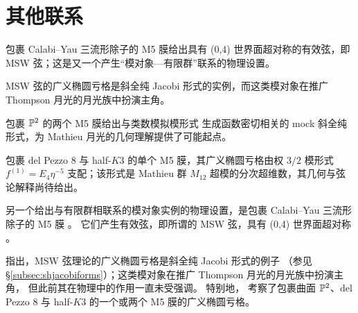 \section{其他联系}
\label{sec:other_physics}

\begin{keytakeaways}
  \item 包裹 Calabi–Yau 三流形除子的 M5 膜给出具有 (0,4) 世界面超对称的有效弦，即 MSW 弦；这是又一个产生“模对象—有限群”联系的物理设置。
  \item MSW 弦的广义椭圆亏格是斜全纯 Jacobi 形式的实例，而这类模对象在推广 Thompson 月光的月光族中扮演主角。
  \item 包裹 $\mathbb{P}^2$ 的两个 M5 膜给出与类数模拟模形式  生成函数密切相关的 mock 斜全纯形式，为 Mathieu 月光的几何理解提供了可能起点。
  \item 包裹 del Pezzo 8 与 half-$K3$ 的单个 M5 膜，其广义椭圆亏格由权 $3/2$ 模形式 $f^{(1)}= E_4\eta^{-5}$ 支配；该形式是 Mathieu 群 $M_{12}$ 超模的分次超维数，其几何与弦论解释尚待给出。
\end{keytakeaways}


另一个给出与有限群相联系的模对象实例的物理设置，是包裹 Calabi–Yau 三流形除子的 M5 膜 \cite{Cheng:2017dlj}。
它们产生有效弦，即所谓的 MSW 弦，具有 (0,4) 世界面超对称 \cite{Maldacena:1997de}。


\cite{Cheng:2017dlj} 指出，MSW 弦理论的广义椭圆亏格是斜全纯 Jacobi 形式的例子
（参见 \S\ref{subsec:shjacobiforms}）；这类模对象在推广 Thompson 月光的月光族中扮演主角，
但此前其在物理中的作用一直未受强调。
特别地，\cite{Cheng:2017dlj} 考察了包裹曲面 $\mathbb{P}^2$、del Pezzo 8 与 half-$K3$ 的一个或两个 M5 膜的广义椭圆亏格。


